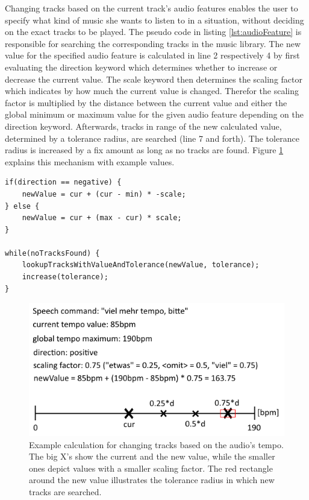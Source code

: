 Changing tracks based on the current track's audio features enables the user to specify what kind of music she wants to listen to in a situation, without deciding on the exact tracks to be played. The pseudo code in listing \ref{lst:audioFeature} is responsible for searching the corresponding tracks in the music library. The new value for the specified audio feature is calculated in line 2 respectively 4 by first evaluating the direction keyword which determines whether to increase or decrease the current value. The scale keyword then determines the scaling factor which indicates by how much the current value is changed. Therefor the scaling factor is multiplied by the distance between the current value and either the global minimum or maximum value for the given audio feature depending on the direction keyword. Afterwards, tracks in  range of the new calculated value, determined by a tolerance radius, are searched (line 7 and forth). The tolerance radius is increased by a fix amount as long as no tracks are found. Figure \ref{fig:audioFeatureExample} explains this mechanism with example values.

\begin{lstlisting}[caption=Pseudo code for calculating the new audio feature value and looking up respective tracks with a tolerance radius from the music library, label=lst:audioFeature]
if(direction == negative) {
	newValue = cur + (cur - min) * -scale;
} else {
	newValue = cur + (max - cur) * scale;
}

while(noTracksFound) {
	lookupTracksWithValueAndTolerance(newValue, tolerance);
	increase(tolerance);
}
\end{lstlisting}

\begin{figure}[bth]
	\myfloatalign
	\includegraphics[width=.99\linewidth]{img/calcAudioFeatureExample.png}
	\caption{Example calculation for changing tracks based on the audio's tempo. The big X's show the current and the new value, while the smaller ones depict values with a smaller scaling factor. The red rectangle around the new value illustrates the tolerance radius in which new tracks are searched.}
	\label{fig:audioFeatureExample}
\end{figure}

